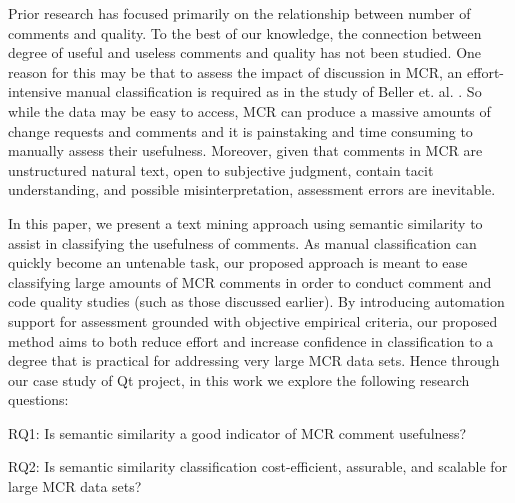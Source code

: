 Prior research has focused primarily on the relationship between number of comments and quality.
To the best of our knowledge, the connection between degree of useful and useless comments and quality has not been studied.
One reason for this may be that to assess the impact of discussion in MCR, an effort-intensive manual classification is required as in the study of Beller et. al. \cite{Beller}.
So while the data may be easy to access, MCR can produce a massive amounts of change requests and comments\cite{Thongtanunam2014} and it is painstaking and time consuming to manually assess their usefulness.
Moreover, given that comments in MCR are unstructured natural text, open to subjective judgment, contain tacit understanding, and possible misinterpretation, assessment errors are inevitable. 







In this paper, we present a text mining approach using semantic similarity to assist in classifying the usefulness of comments.
As manual classification can quickly become an untenable task, our proposed approach is meant to ease classifying large amounts of MCR comments in order to conduct comment and code quality studies (such as those discussed earlier).
By introducing automation support for assessment grounded with objective empirical criteria, our proposed method aims to both reduce effort and increase confidence in classification to a degree that is practical for addressing very large MCR data sets.
Hence through our case study of Qt project, in this work we explore the following research questions:
\begin{ResearchQuestions}
\item[RQ1:] Is semantic similarity a good indicator of MCR comment usefulness?\\
\item[RQ2:] Is semantic similarity classification cost-efficient, assurable, and scalable for large MCR data sets?
\end{ResearchQuestions}


